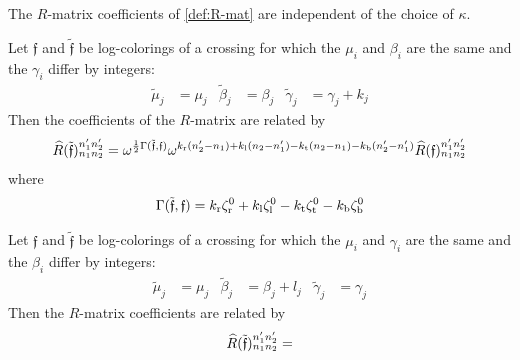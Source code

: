 \documentclass{sl2ams}
\numberwithin{equation}{section}
\begin{document}
\begin{lemma}
  \label{thm:R-matrix transformation}
  \begin{thmenum}
  \item
    \label{thm:R-matrix transformation:kappa}
    The \(R\)-matrix coefficients of \cref{def:R-mat} are independent of the choice of \(\kappa\).
  \item
    \label{thm:R-matrix transformation:gamma}
    Let \(\mathfrak{f}\) and \(\tilde{\mathfrak{f}}\) be log-colorings of a crossing for which the \(\mu_i\) and \(\beta_i\) are the same and the \(\gamma_i\) differ by integers:
    \begin{align*}
      \tilde \mu_j &= \mu_j
                   &
      \tilde \beta_j &= \beta_j
                     &
      \tilde \gamma_j &= \gamma_j + k_j
    \end{align*}
    Then the coefficients of the \(R\)-matrix are related by
    \begin{equation}
      \label{eq:R-matrix transformation:gamma}
      \rmat[\tilde{\mathfrak{f}}]{n_{1}}{n_{2}}{n_{1}'}{n_{2}'}
      =
      \omega^{
        \frac{1}{2}
        \Gamma(\tilde{\mathfrak{f}}, \mathfrak{f}) 
      }
      \omega^{
        k_{\lN}(n_{2}' - n_{1})
            +
            k_{\lS}(n_{2} - n_{1}')
            -
            k_{\lW}(n_{2} - n_{1})
            -
            k_{\lE}(n_{2}' - n_{1}')
          }
          \rmat[\mathfrak{f}]{n_{1}}{n_{2}}{n_{1}'}{n_{2}'}
      \end{equation}
      where
      \[
        \Gamma(\tilde{\mathfrak{f}}, \mathfrak{f})
          =
          k_{\mathrm{r}}\zeta_{\mathrm{r}}^{0}
          +
          k_{\mathrm{l}}\zeta_{\mathrm{l}}^{0}
          -
          k_{\mathrm{t}}\zeta_{\mathrm{t}}^{0}
          -
          k_{\mathrm{b}}\zeta_{\mathrm{b}}^{0}
      \]
    \item
      \label{thm:R-matrix transformation:beta}
      Let \(\mathfrak{f}\) and \(\tilde{\mathfrak{f}}\) be log-colorings of a crossing for which the \(\mu_i\) and \(\gamma_i\) are the same and the \(\beta_i\) differ by integers:
      \begin{align*}
        \tilde \mu_j &= \mu_j
                     &
        \tilde \beta_j &= \beta_j + l_j
                       &
        \tilde \gamma_j &= \gamma_j
      \end{align*}
      Then the \(R\)-matrix coefficients are related by
      \begin{equation}
        \label{eq:R-matrix transformation:beta}
          \rmat[\tilde{\mathfrak{f}}]{n_{1}}{n_{2}}{n_{1}'}{n_{2}'}
          =

\end{equation}
\end{thmenum}
\end{lemma}
\end{document}
